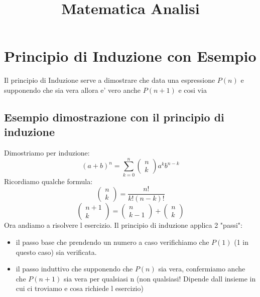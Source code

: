 \documentclass{article}
\title{Matematica Analisi}
\begin{document}
   \section{Principio di Induzione con Esempio}
   \begin{flushleft}
    Il principio di Induzione serve a dimostrare che data una espressione $P(n)$ e supponendo che sia vera allora e' vero anche $P(n+1)$ e cosi via
   \end{flushleft}
   \subsection{Esempio dimostrazione con il principio di induzione}
   \begin{flushleft}
    Dimostriamo per induzione:
    \begin{equation}
        (a+b)^n= \sum_{k=0}^{n}
        \begin{pmatrix}
            n\\
            k
        \end{pmatrix}a^kb^{n-k}
    \end{equation}
    Ricordiamo qualche formula:
    \begin{equation}
        \begin{pmatrix}
            n\\
            k
        \end{pmatrix}=\frac{n!}{k!(n-k)!}
    \end{equation}
    \begin{equation}
        \begin{pmatrix}
            n+1\\
            k
        \end{pmatrix}=\begin{pmatrix}
                        n\\
                        k-1
                      \end{pmatrix}+\begin{pmatrix}
                                       n\\
                                       k
                                     \end{pmatrix}
    \end{equation}
    Ora andiamo a risolvere l esercizio. Il principio di induzione applica 2 "passi":
    \begin{itemize}
    \item il passo base che prendendo un numero a caso verifichiamo che $P(1)$ (1 in questo caso) sia verificata.
    \item il passo induttivo che supponendo che $P(n)$ sia vera, confermiamo anche che $P(n+1)$ sia vera per qualsiasi n (non qualsiasi! Dipende dall insieme in cui ci troviamo e cosa richiede l esercizio)
    \end{itemize}

\end{flushleft}
\end{document}

